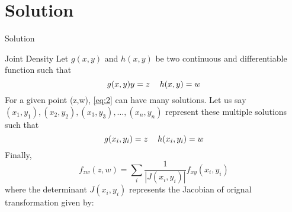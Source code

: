\documentclass{beamer}
\begin{document}
\section{Solution}
\begin{frame}{Solution}
    \begin{alertblock}{Joint Density}
        Let $g(x,y)$ and $h(x,y)$ be two continuous and differentiable function such that
            \begin{equation}
                g({x},{y})y = {z} \hspace*{12pt} h({x},{y}) = {w} \label{eq:2}
            \end{equation}
        For a given point ({z},{w}), \eqref{eq:2} can have many solutions. Let us say $(x_1,y_1),(x_2,y_2),(x_3,y_3),\ldots,(x_n,y_n)$ represent these multiple solutions such that
        \begin{equation}
            g({x}_i,{y}_i) = {z} \hspace*{12pt} h({x}_i,{y}_i) = {w} \label{eq:3}
        \end{equation}
        Finally,
        \begin{equation}
            f_{zw}(z,w) = \sum_i \frac{1}{|J(x_i,y_i)|}f_{xy}(x_i,y_i) \label{eq:4}
        \end{equation}
        where the determinant $J(x_i,y_i)$ represents the Jacobian of orignal transformation given by:
    \end{alertblock}
\end{frame}
\end{document}
